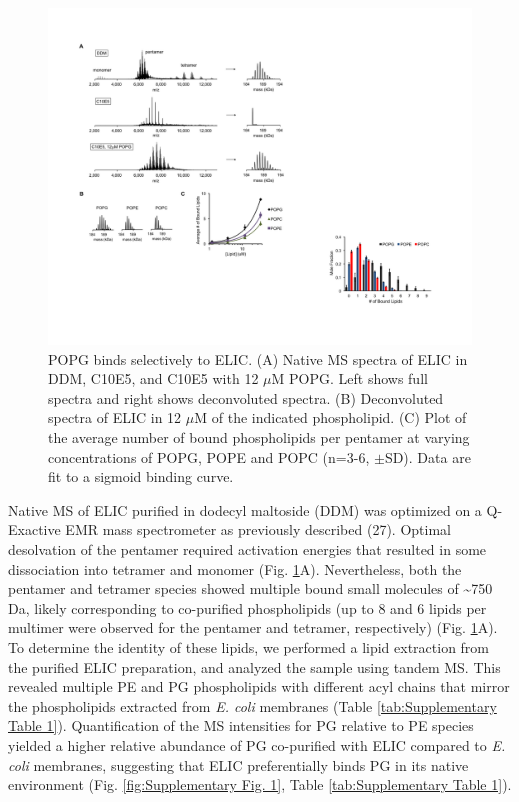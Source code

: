 \begin{figure}
\center
\includegraphics[width=\linewidth]{./pandoc_test/media/image1.pdf}
	\begin{flushleft}

\caption[POPG binds selectively to ELIC.] {POPG binds selectively to ELIC. (A) Native MS spectra of ELIC in DDM, C10E5, and C10E5 with 12 $\mu$M POPG. Left shows full spectra and right shows deconvoluted spectra. (B) Deconvoluted spectra of ELIC in 12 $\mu$M of the indicated phospholipid. (C) Plot of the average number of bound phospholipids per pentamer at varying concentrations of POPG, POPE and POPC (n=3-6, $\pm$SD). Data are fit to a sigmoid binding curve.}
	\label{fig:one}
	\end{flushleft}

\end{figure}

Native MS of ELIC purified in dodecyl maltoside (DDM) was optimized on a
Q-Exactive EMR mass spectrometer as previously described (27). Optimal
desolvation of the pentamer required activation energies that resulted
in some dissociation into tetramer and monomer (Fig. \ref{fig:one}A). Nevertheless,
both the pentamer and tetramer species showed multiple bound small
molecules of \textasciitilde{}750 Da, likely corresponding to
co-purified phospholipids (up to 8 and 6 lipids per multimer were
observed for the pentamer and tetramer, respectively) (Fig. \ref{fig:one}A). To
determine the identity of these lipids, we performed a lipid extraction
from the purified ELIC preparation, and analyzed the sample using tandem
MS. This revealed multiple PE and PG phospholipids with different acyl
chains that mirror the phospholipids extracted from \emph{E. coli}
membranes (Table \ref{tab:Supplementary Table 1}). Quantification of the MS intensities
for PG relative to PE species yielded a higher relative abundance of PG
co-purified with ELIC compared to \emph{E. coli} membranes, suggesting
that ELIC preferentially binds PG in its native environment
(Fig. \ref{fig:Supplementary Fig. 1}, Table \ref{tab:Supplementary Table 1}).

